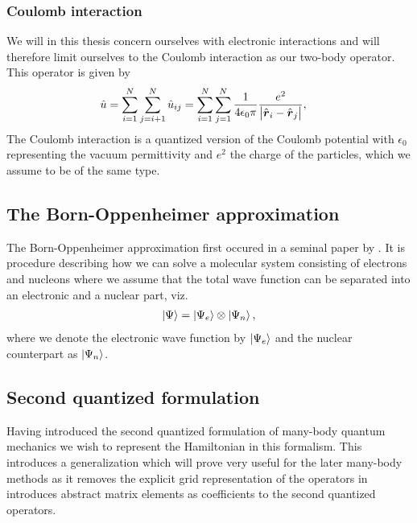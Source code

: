             \subsubsection{Coulomb interaction}
                We will in this thesis concern ourselves with electronic
                interactions and will therefore limit ourselves to the Coulomb
                interaction as our two-body operator.
                This operator is given by
                \begin{align}
                    \hat{u}
                    &= \sum_{i = 1}^{N}\sum_{j = i + 1}^{N}
                    \hat{u}_{ij}
                    = \sum_{i = 1}^{N}\sum_{j = 1}^{N}
                    \frac{1}{4\epsilon_0\pi}\frac{e^2}{\abs{\hat{\boldsymbol{r}}_i -
                    \hat{\boldsymbol{r}}_j}},
                \end{align}
                The Coulomb interaction is a quantized version of the Coulomb
                potential with $\epsilon_0$ representing the vacuum
                permittivity and $e^2$ the charge of the particles, which we
                assume to be of the same type.

        \subsection{The Born-Oppenheimer approximation}
            The Born-Oppenheimer approximation first occured in a seminal paper
            by \citeauthor{born1927quantentheorie}
            \cite{born1927quantentheorie}.
            It is procedure describing how we can solve a molecular system
            consisting of electrons and nucleons where we assume that the total
            wave function can be separated into an electronic and a nuclear
            part, viz.
            \begin{align}
                \ket{\Psi} = \ket{\Psi_e}\otimes\ket{\Psi_n},
            \end{align}
            where we denote the electronic wave function by $\ket{\Psi_e}$ and
            the nuclear counterpart as $\ket{\Psi_n}$.

        \subsection{Second quantized formulation}
            Having introduced the second quantized formulation of many-body
            quantum mechanics we wish to represent the Hamiltonian in this
            formalism.
            This introduces a generalization which will prove very useful for
            the later many-body methods as it removes the explicit grid
            representation of the operators in introduces abstract matrix
            elements as coefficients to the second quantized operators.

